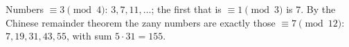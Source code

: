 Numbers $\equiv3\pmod4$: $3,7,11,\dots$; the first that is $\equiv1\pmod3$ is $7$. By the Chinese remainder theorem the zany numbers are exactly those $\equiv7\pmod{12}$: $7,19,31,43,55$, with sum $5\cdot31=\boxed{155}$.
